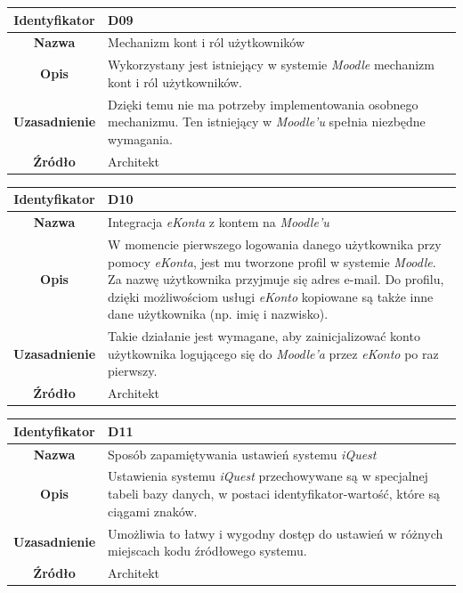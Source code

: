 \begin{table}[H]
\centering
\begin{tabular}{ | >{\bfseries}c | p{11cm} | }
\hline
%
Identyfikator & D09 \\ \hline
Nazwa & Mechanizm kont i ról użytkowników \\ \hline
Opis & Wykorzystany jest istniejący w systemie \textit{Moodle} mechanizm kont i ról użytkowników. \\ \hline
Uzasadnienie & Dzięki temu nie ma potrzeby implementowania osobnego mechanizmu. Ten istniejący w \textit{Moodle'u} spełnia niezbędne wymagania. \\ \hline
Źródło & Architekt \\ \hline
%
\end{tabular}
\end{table}

\begin{table}[H]
\centering
\begin{tabular}{ | >{\bfseries}c | p{11cm} | }
\hline
%
Identyfikator & D10 \\ \hline
Nazwa & Integracja \textit{eKonta} z kontem na \textit{Moodle'u} \\ \hline
Opis & W momencie pierwszego logowania danego użytkownika przy pomocy \textit{eKonta}, jest mu tworzone profil w systemie \textit{Moodle}. Za nazwę użytkownika przyjmuje się adres e-mail. Do profilu, dzięki możliwościom usługi \textit{eKonto} kopiowane są także inne dane użytkownika (np. imię i nazwisko). \\ \hline
Uzasadnienie & Takie działanie jest wymagane, aby zainicjalizować konto użytkownika logującego się do \textit{Moodle'a} przez \textit{eKonto} po raz pierwszy. \\ \hline
Źródło & Architekt \\ \hline
%
\end{tabular}
\end{table}

\begin{table}[H]
\centering
\begin{tabular}{ | >{\bfseries}c | p{11cm} | }
\hline
%
Identyfikator & D11 \\ \hline
Nazwa & Sposób zapamiętywania ustawień systemu \textit{iQuest}  \\ \hline
Opis & Ustawienia systemu \textit{iQuest} przechowywane są w specjalnej tabeli bazy danych, w postaci identyfikator-wartość, które są ciągami znaków. \\ \hline
Uzasadnienie & Umożliwia to łatwy i wygodny dostęp do ustawień w różnych miejscach kodu źródłowego systemu. \\ \hline
Źródło & Architekt \\ \hline
%
\end{tabular}
\end{table}

